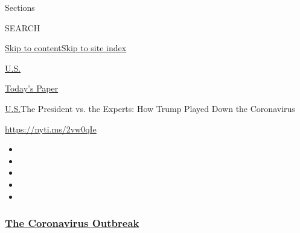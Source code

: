 Sections

SEARCH

\protect\hyperlink{site-content}{Skip to
content}\protect\hyperlink{site-index}{Skip to site index}

\href{https://www.nytimes3xbfgragh.onion/section/us}{U.S.}

\href{https://myaccount.nytimes3xbfgragh.onion/auth/login?response_type=cookie\&client_id=vi}{}

\href{https://www.nytimes3xbfgragh.onion/section/todayspaper}{Today's
Paper}

\href{/section/us}{U.S.}\textbar{}The President vs. the Experts: How
Trump Played Down the Coronavirus

\url{https://nyti.ms/2vw0qIe}

\begin{itemize}
\item
\item
\item
\item
\item
\end{itemize}

\hypertarget{the-coronavirus-outbreak}{%
\subsubsection{\texorpdfstring{\href{https://www.nytimes3xbfgragh.onion/news-event/coronavirus?name=styln-coronavirus-national\&region=TOP_BANNER\&variant=undefined\&block=storyline_menu_recirc\&action=click\&pgtype=Interactive\&impression_id=7f0c4ed0-e385-11ea-a6bd-919622e83b69}{The
Coronavirus
Outbreak}}{The Coronavirus Outbreak}}\label{the-coronavirus-outbreak}}


